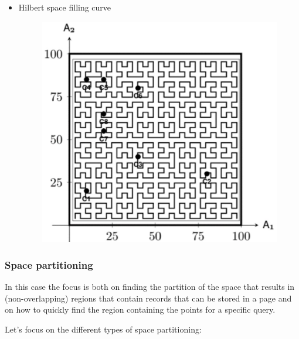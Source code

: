 \begin{itemize}
    \item Hilbert space filling curve

    \begin{figure}[H]
		\centering
		\includegraphics[scale = 0.7]{img/line4.jpg}
		\label{line4}
    \end{figure}
    
\end{itemize}

\subsubsection{Space partitioning}
In this case the focus is both on finding the partition of the space that results in (non-overlapping) regions that contain records that can be stored in a page and on how to quickly find the region containing the points for a specific query.

Let's focus on the different types of space partitioning:

